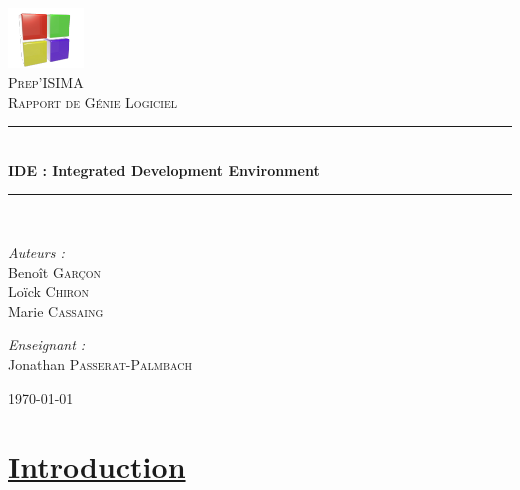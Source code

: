\documentclass[a4paper, 12pt]{article}
\newcommand{\HRule}{\rule{\linewidth}{0.5mm}}
\begin{document}
\pagecolor{bleuciel}


\begin{titlepage}
\begin{center}
\includegraphics[width=0.15\textwidth]{./images/logo.png}~\\[1cm]

\textsc{\LARGE Prep'ISIMA}\\[1.5cm]

\textsc{\Large Rapport de Génie Logiciel}\\[0.5cm]


\HRule \\[0.4cm]
{ \huge \bfseries IDE : Integrated Development Environment}\\[0.4cm]

\HRule \\[1.5cm]

\begin{minipage}{0.4\textwidth}
\begin{flushleft} \large
\emph{Auteurs :}\\
Benoît \textsc{Garçon}\\
Loïck \textsc{Chiron}\\
Marie \textsc{Cassaing}
\end{flushleft}
\end{minipage}
\begin{minipage}{0.4\textwidth}
\begin{flushright} \large
\emph{Enseignant :} \\
Jonathan \textsc{Passerat-Palmbach}
\end{flushright}
\end{minipage}

\vfill


{\large \today}

\end{center}
\end{titlepage}

\setcounter{page}{1}

\newpage \renewcommand{\contentsname}{Sommaire}  \tableofcontents
\pagecolor{blanc}

\newpage \section*{\underline{Introduction}} 
\end{document}

